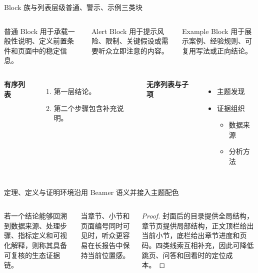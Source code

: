 \documentclass[aspectratio=169]{beamer}
\begin{document}
\begin{frame}{Block 族与列表层级}{普通、警示、示例三类块}
  \begin{columns}[T,onlytextwidth]
      \begin{block}{普通 Block}
        用于承载一般性说明、定义前置条件和页面中的稳定信息。
      \end{block}

      \begin{alertblock}{Alert Block}
        用于提示风险、限制、关键假设或需要听众立即注意的内容。
      \end{alertblock}

      \begin{exampleblock}{Example Block}
        用于展示案例、经验规则、可复用写法或正向结论。
      \end{exampleblock}
  \end{columns}

  \vspace{.38cm}
  \begin{columns}[T,onlytextwidth]
      \textbf{有序列表}
      \begin{enumerate}
        \item 第一层结论。
        \item 第二个步骤包含补充说明。
      \end{enumerate}
      \textbf{无序列表与子项}
      \begin{itemize}
        \item 主题发现
        \item 证据组织
          \begin{itemize}
            \item 数据来源
            \item 分析方法
          \end{itemize}
      \end{itemize}
  \end{columns}
\end{frame}

\begin{frame}{定理、定义与证明环境}{沿用 Beamer 语义并接入主题配色}
  \begin{columns}[T,onlytextwidth]
      \begin{nslrule}[证据链]
        若一个结论能够回溯到数据来源、处理步骤、指标定义和可视化解释，则称其具备可复核的生态证据链。
      \end{nslrule}

      \begin{nslclaim}[导航可解释性]
        当章节、小节和页面编号同时可见时，听众更容易在长报告中保持当前位置感。
      \end{nslclaim}

      \begin{proof}
        封面后的目录提供全局结构，章节页提供局部结构，正文顶栏给出当前小节，底栏给出章节进度和页码。四类线索互相补充，因此可降低跳页、问答和回看时的定位成本。
      \end{proof}
  \end{columns}
\end{frame}
\end{document}
